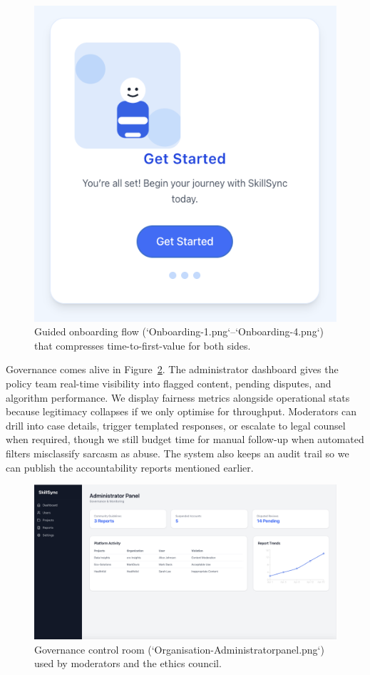 \begin{figure}[h]
\begin{minipage}[b]{0.48\linewidth}
    \includegraphics[width=\linewidth]{figures/Onboarding-4.png}
  \end{minipage}
  \caption{Guided onboarding flow (`Onboarding-1.png`--`Onboarding-4.png`) that compresses time-to-first-value for both sides.}
  \label{fig:onboarding-flow}
\end{figure}

Governance comes alive in Figure~\ref{fig:admin-panel}. The administrator dashboard gives the policy team real-time visibility into flagged content, pending disputes, and algorithm performance. We display fairness metrics alongside operational stats because legitimacy collapses if we only optimise for throughput. Moderators can drill into case details, trigger templated responses, or escalate to legal counsel when required, though we still budget time for manual follow-up when automated filters misclassify sarcasm as abuse. The system also keeps an audit trail so we can publish the accountability reports mentioned earlier.

\begin{figure}[h]
  \centering
  \includegraphics[width=0.85\linewidth]{figures/Organisation-Administratorpanel.png}
  \caption{Governance control room (`Organisation-Administratorpanel.png`) used by moderators and the ethics council.}
  \label{fig:admin-panel}
\end{figure}

